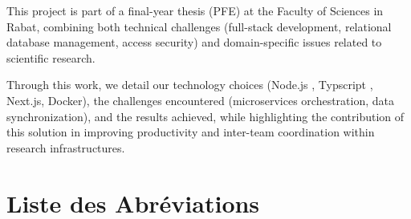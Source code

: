 \documentclass[12pt]{rapportPfe}
\begin{document}
This project is part of a final-year thesis (PFE) at the Faculty of Sciences in Rabat, combining both technical challenges (full-stack development, relational database management, access security) and domain-specific issues related to scientific research.

Through this work, we detail our technology choices (Node.js , Typscript , Next.js, Docker), the challenges encountered (microservices orchestration, data synchronization), and the results achieved, while highlighting the contribution of this solution in improving productivity and inter-team coordination within research infrastructures.

\newpage
\thispagestyle{empty}
\null
\newpage

\chapter*{Liste des Abréviations}
\end{document}
